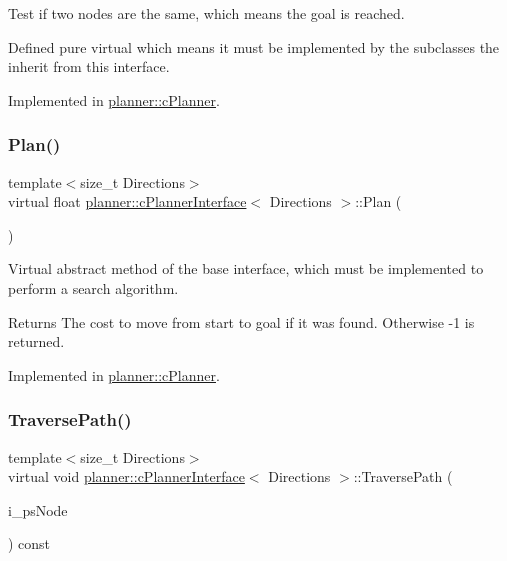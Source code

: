 Test if two nodes are the same, which means the goal is reached. 

Defined pure virtual which means it must be implemented by the subclasses the inherit from this interface. 

Implemented in \mbox{\hyperlink{classplanner_1_1c_planner_a8b241ebd7bb3bde3dd062c50a2a42339}{planner\+::c\+Planner}}.

\mbox{\label{classplanner_1_1c_planner_interface_a4d8effce5ee5d097a30465280e9416d6}} 
\subsubsection{\texorpdfstring{Plan()}{Plan()}}
{\footnotesize\ttfamily template$<$size\+\_\+t Directions$>$ \\
virtual float \mbox{\hyperlink{classplanner_1_1c_planner_interface}{planner\+::c\+Planner\+Interface}}$<$ Directions $>$\+::Plan (\begin{DoxyParamCaption}{ }\end{DoxyParamCaption})\hspace{0.3cm}{\ttfamily [pure virtual]}}



Virtual abstract method of the base interface, which must be implemented to perform a search algorithm. 

\begin{DoxyReturn}{Returns}
The cost to move from start to goal if it was found. Otherwise -\/1 is returned. 
\end{DoxyReturn}


Implemented in \mbox{\hyperlink{classplanner_1_1c_planner_a7c4defd454429503d4e47b552a5311fb}{planner\+::c\+Planner}}.

\mbox{\label{classplanner_1_1c_planner_interface_a5c30b547b681b04434102fbcc7c72ea3}} 
\subsubsection{\texorpdfstring{Traverse\+Path()}{TraversePath()}}
{\footnotesize\ttfamily template$<$size\+\_\+t Directions$>$ \\
virtual void \mbox{\hyperlink{classplanner_1_1c_planner_interface}{planner\+::c\+Planner\+Interface}}$<$ Directions $>$\+::Traverse\+Path (\begin{DoxyParamCaption}\item[{\mbox{\hyperlink{structplanner_1_1t_node}{t\+Node}} $\ast$}]{i\+\_\+ps\+Node }\end{DoxyParamCaption}) const\hspace{0.3cm}{\ttfamily [pure virtual]}}



